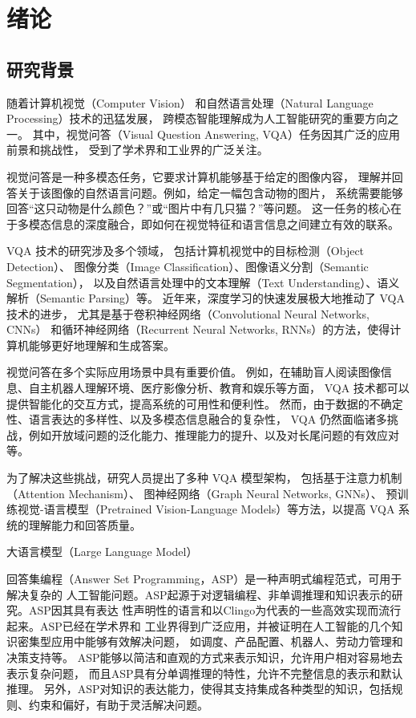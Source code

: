 \chapter{绪论}
\section{研究背景}
随着计算机视觉（Computer Vision）
和自然语言处理（Natural Language Processing）技术的迅猛发展，
跨模态智能理解成为人工智能研究的重要方向之一。
其中，视觉问答（Visual Question Answering, VQA）\cite{goyal2017making}任务因其广泛的应用前景和挑战性，
受到了学术界和工业界的广泛关注。

视觉问答是一种多模态任务，它要求计算机能够基于给定的图像内容，
理解并回答关于该图像的自然语言问题。例如，给定一幅包含动物的图片，
系统需要能够回答“这只动物是什么颜色？”或“图片中有几只猫？”等问题。
这一任务的核心在于多模态信息的深度融合，即如何在视觉特征和语言信息之间建立有效的联系。

VQA 技术的研究涉及多个领域，
包括计算机视觉中的目标检测（Object Detection）、
图像分类（Image Classification）、图像语义分割（Semantic Segmentation），
以及自然语言处理中的文本理解（Text Understanding）、语义解析（Semantic Parsing）等。
近年来，深度学习的快速发展极大地推动了 VQA 技术的进步，
尤其是基于卷积神经网络（Convolutional Neural Networks, CNNs）
和循环神经网络（Recurrent Neural Networks, RNNs）的方法，使得计算机能够更好地理解和生成答案。

视觉问答在多个实际应用场景中具有重要价值。
例如，在辅助盲人阅读图像信息、自主机器人理解环境、医疗影像分析、教育和娱乐等方面，
VQA 技术都可以提供智能化的交互方式，提高系统的可用性和便利性。
然而，由于数据的不确定性、语言表达的多样性、以及多模态信息融合的复杂性，
VQA 仍然面临诸多挑战，例如开放域问题的泛化能力、推理能力的提升、以及对长尾问题的有效应对等。

为了解决这些挑战，研究人员提出了多种 VQA 模型架构，
包括基于注意力机制（Attention Mechanism）\cite{Bahdanau2015Attention}、
图神经网络（Graph Neural Networks, GNNs）、
预训练视觉-语言模型（Pretrained Vision-Language Models）等方法，以提高 VQA 系统的理解能力和回答质量。

大语言模型（Large Language Model）

回答集编程（Answer Set Programming，ASP）是一种声明式编程范式，可用于解决复杂的
人工智能问题。ASP起源于对逻辑编程、非单调推理和知识表示的研究。ASP因其具有表达
性声明性的语言和以Clingo为代表的一些高效实现而流行起来。ASP已经在学术界和
工业界得到广泛应用，并被证明在人工智能的几个知识密集型应用中能够有效解决问题，
如调度、产品配置、机器人、劳动力管理和决策支持等。
ASP能够以简洁和直观的方式来表示知识，允许用户相对容易地去表示复杂问题，
而且ASP具有分单调推理的特性，允许不完整信息的表示和默认推理。
另外，ASP对知识的表达能力，使得其支持集成各种类型的知识，包括规则、约束和偏好，有助于灵活解决问题。

